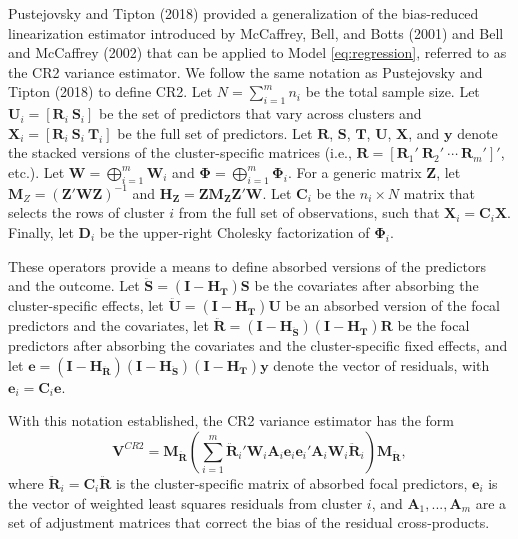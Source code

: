 \documentclass[12pt]{article}
\begin{document}
Pustejovsky and Tipton (2018) provided a generalization of the
bias-reduced linearization estimator introduced by McCaffrey, Bell, and
Botts (2001) and Bell and McCaffrey (2002) that can be applied to Model
\ref{eq:regression}, referred to as the CR2 variance estimator. We
follow the same notation as Pustejovsky and Tipton (2018) to define CR2.
Let \(N = \sum_{i=1}^m n_i\) be the total sample size. Let
\(\mathbf{U}_i = \left[ \mathbf{R}_i \ \mathbf{S}_i \right]\) be the set
of predictors that vary across clusters and
\(\mathbf{X}_i = \left[ \mathbf{R}_i \ \mathbf{S}_i \ \mathbf{T}_i \right]\)
be the full set of predictors. Let \(\mathbf{R}\), \(\mathbf{S}\),
\(\mathbf{T}\), \(\mathbf{U}\), \(\mathbf{X}\), and \(\mathbf{y}\)
denote the stacked versions of the cluster-specific matrices (i.e.,
\(\mathbf{R} = \left[\mathbf{R}_1' \ \mathbf{R}_2' \ \cdots \ \mathbf{R}_m'\right]'\),
etc.). Let \(\mathbf{W} = \bigoplus_{i=1}^m \mathbf{W}_i\) and
\(\boldsymbol\Phi = \bigoplus_{i=1}^m \boldsymbol\Phi_i\). For a generic
matrix \(\mathbf{Z}\), let
\(\mathbf{M}_{Z} = \left(\mathbf{Z}'\mathbf{W}\mathbf{Z}\right)^{-1}\)
and
\(\mathbf{H}_{\mathbf{Z}} = \mathbf{Z} \mathbf{M}_{\mathbf{Z}}\mathbf{Z}'\mathbf{W}\).
Let \(\mathbf{C}_i\) be the \(n_i \times N\) matrix that selects the
rows of cluster \(i\) from the full set of observations, such that
\(\mathbf{X}_i = \mathbf{C}_i \mathbf{X}\). Finally, let
\(\mathbf{D}_i\) be the upper-right Cholesky factorization of
\(\mathbf{\Phi}_i\).

These operators provide a means to define absorbed versions of the
predictors and the outcome. Let
\(\mathbf{\ddot{S}} = \left(\mathbf{I} - \mathbf{H}_{\mathbf{T}}\right) \mathbf{S}\)
be the covariates after absorbing the cluster-specific effects, let
\(\mathbf{\ddot{U}} = \left(\mathbf{I} - \mathbf{H}_{\mathbf{T}}\right) \mathbf{U}\)
be an absorbed version of the focal predictors and the covariates, let
\(\mathbf{\ddot{R}} = \left(\mathbf{I} - \mathbf{H}_{\mathbf{\ddot{S}}}\right)\left(\mathbf{I} - \mathbf{H}_{\mathbf{T}}\right) \mathbf{R}\)
be the focal predictors after absorbing the covariates and the
cluster-specific fixed effects, and let
\(\mathbf{e} = \left(\mathbf{I} - \mathbf{H}_{\mathbf{\ddot{R}}}\right)\left(\mathbf{I} - \mathbf{H}_{\mathbf{\ddot{S}}}\right)\left(\mathbf{I} - \mathbf{H}_{\mathbf{T}}\right) \mathbf{y}\)
denote the vector of residuals, with
\(\mathbf{e}_i = \mathbf{C}_i\mathbf{e}\).

With this notation established, the CR2 variance estimator has the form
\begin{equation}
\mathbf{V}^{CR2} = \mathbf{M}_{\mathbf{\ddot{R}}} \left(\sum_{i=1}^m \mathbf{\ddot{R}}_i' \mathbf{W}_i \mathbf{A}_i \mathbf{e}_i \mathbf{e}_i' \mathbf{A}_i \mathbf{W}_i \mathbf{\ddot{R}}_i \right) \mathbf{M}_{\mathbf{\ddot{R}}},
\end{equation} where
\(\mathbf{\ddot{R}}_i = \mathbf{C}_i \mathbf{\ddot{R}}\) is the
cluster-specific matrix of absorbed focal predictors, \(\mathbf{e}_i\)
is the vector of weighted least squares residuals from cluster \(i\),
and \(\mathbf{A}_1,...,\mathbf{A}_m\) are a set of adjustment matrices
that correct the bias of the residual cross-products.
\end{document}
